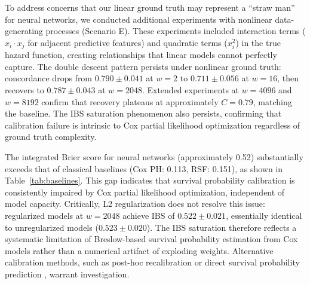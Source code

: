 \documentclass[12pt,a4paper]{article}
\begin{document}
To address concerns that our linear ground truth may represent a ``straw man'' for neural networks, we conducted additional experiments with nonlinear data-generating processes (Scenario E). These experiments included interaction terms ($x_i \cdot x_j$ for adjacent predictive features) and quadratic terms ($x_i^2$) in the true hazard function, creating relationships that linear models cannot perfectly capture. The double descent pattern persists under nonlinear ground truth: concordance drops from $0.790 \pm 0.041$ at $w = 2$ to $0.711 \pm 0.056$ at $w = 16$, then recovers to $0.787 \pm 0.043$ at $w = 2048$. Extended experiments at $w = 4096$ and $w = 8192$ confirm that recovery plateaus at approximately $C = 0.79$, matching the baseline. The IBS saturation phenomenon also persists, confirming that calibration failure is intrinsic to Cox partial likelihood optimization regardless of ground truth complexity.

The integrated Brier score for neural networks (approximately 0.52) substantially exceeds that of classical baselines (Cox PH: 0.113, RSF: 0.151), as shown in Table~\ref{tab:baselines}. This gap indicates that survival probability calibration is consistently impaired by Cox partial likelihood optimization, independent of model capacity. Critically, L2 regularization does not resolve this issue: regularized models at $w = 2048$ achieve IBS of $0.522 \pm 0.021$, essentially identical to unregularized models ($0.523 \pm 0.020$). The IBS saturation therefore reflects a systematic limitation of Breslow-based survival probability estimation from Cox models rather than a numerical artifact of exploding weights. Alternative calibration methods, such as post-hoc recalibration \citep{crowson2016assessing, vancalster2019calibration} or direct survival probability prediction \citep[e.g.,][]{lee2018deephit}, warrant investigation.

\end{document}
